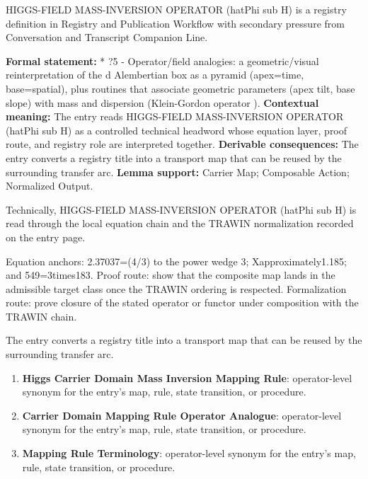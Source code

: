 
\begingroup\small
{}
HIGGS-FIELD MASS-INVERSION OPERATOR (hatPhi sub H) is a registry definition in Registry and Publication Workflow with secondary pressure from Conversation and Transcript Companion Line.

\begingroup\footnotesize\setlength{\emergencystretch}{3em}\sloppy
\textbf{Formal statement:} * ?5 - Operator/field analogies: a geometric/visual reinterpretation of the d Alembertian box as a pyramid (apex=time, base=spatial), plus routines that associate geometric parameters (apex tilt, base slope) with mass and dispersion (Klein-Gordon operator ). \textbf{Contextual meaning:} The entry reads HIGGS-FIELD MASS-INVERSION OPERATOR (hatPhi sub H) as a controlled technical headword whose equation layer, proof route, and registry role are interpreted together. \textbf{Derivable consequences:} The entry converts a registry title into a transport map that can be reused by the surrounding transfer arc. \textbf{Lemma support:} Carrier Map; Composable Action; Normalized Output.\par
\endgroup

Technically, HIGGS-FIELD MASS-INVERSION OPERATOR (hatPhi sub H) is read through the local equation chain and the TRAWIN normalization recorded on the entry page.

Equation anchors: 2.37037=(4/3) to the power wedge 3; Xapproximately1.185; and 549=3times183. Proof route: show that the composite map lands in the admissible target class once the TRAWIN ordering is respected. Formalization route: prove closure of the stated operator or functor under composition with the TRAWIN chain.

The entry converts a registry title into a transport map that can be reused by the surrounding transfer arc.
\endgroup

\begin{enumerate}[leftmargin=1.6em,itemsep=6pt,topsep=4pt]
\item \textbf{Higgs Carrier Domain Mass Inversion Mapping Rule}: operator-level synonym for the entry's map, rule, state transition, or procedure.
\item \textbf{Carrier Domain Mapping Rule Operator Analogue}: operator-level synonym for the entry's map, rule, state transition, or procedure.
\item \textbf{Mapping Rule Terminology}: operator-level synonym for the entry's map, rule, state transition, or procedure.
\end{enumerate}

